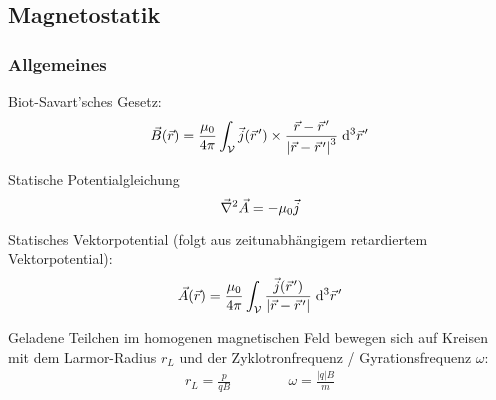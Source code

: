 \documentclass[11pt]{article}
\numberwithin{equation}{section}
\begin{document}
		\subsection{Magnetostatik}
			\subsubsection{Allgemeines}
				\noindent
				Biot-Savart'sches Gesetz:
				\begin{equation}
					\vec{B}(\vec{r}) = \frac{\mu_0}{4\pi}\int_{\mathcal{V}} \vec{j}(\pvec{r}')\times\frac{\vec{r}-\pvec{r}'}{\left|\vec{r}-\pvec{r}'\right|^3}\;\diff^3\pvec{r}'
				\end{equation}

				\noindent
				Statische Potentialgleichung
				\begin{equation}
					\vec{\nabla}^2 \vec{A} = - \mu_0 \vec{j}
				\end{equation}

				\noindent
				Statisches Vektorpotential (folgt aus zeitunabhängigem retardiertem Vektorpotential):
				\begin{equation}
					\vec{A}(\vec{r}) = \frac{\mu_0}{4\pi} \int_{\mathcal{V}} \frac{\vec{j}(\pvec{r}')}{\left|\vec{r}-\pvec{r}'\right|} \;\diff^3\pvec{r}'
				\end{equation}

				\noindent
				Geladene Teilchen im homogenen magnetischen Feld bewegen sich auf Kreisen mit dem Larmor-Radius $r_L$ und der Zyklotronfrequenz / Gyrationsfrequenz $\omega$:
				\begin{equation}
					\begin{aligned}
						r_L = \frac{p}{qB} &&\hspace{30pt} %
						\omega = \frac{|q| B}{m}
					\end{aligned}
				\end{equation}
\end{document}
